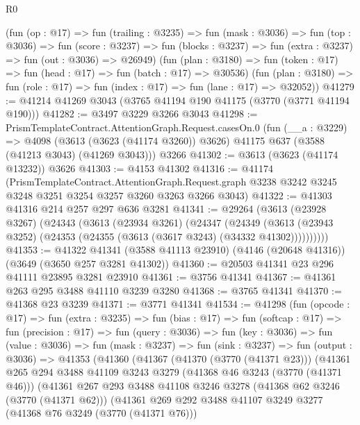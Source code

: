 \begin{lexlean}{R0}
\begin{coremodule}
      (fun (op : @17) =>
      fun (trailing : @3235) =>
      fun (mask : @3036) =>
      fun (top : @3036) =>
      fun (score : @3237) =>
      fun (blocks : @3237) => fun (extra : @3237) => fun (out : @3036) => @26949)
      (fun (plan : @3180) => fun (token : @17) => fun (head : @17) => fun (batch : @17) => @30536)
      (fun (plan : @3180) => fun (role : @17) => fun (index : @17) => fun (lane : @17) => @32052))
@41279 := @41214 @41269 @3043 (@3765 @41194 @190 @41175 (@3770 (@3771 @41194 @190)))
@41282 := @3497 @3229 @3266 @3043
@41298 := PrismTemplateContract.AttentionGraph.Request.casesOn.{0}
    (fun (__a : @3229) =>
    @4098 (@3613 (@3623 (@41174 @3260)) @3626) @41175 @637 (@3588 (@41213 @3043) (@41269 @3043)))
    @3266
@41302 := @3613 (@3623 (@41174 @13232)) @3626
@41303 := @4153 @41302
@41316 := @41174
    (PrismTemplateContract.AttentionGraph.Request.graph
      @3238
      @3242
      @3245
      @3248
      @3251
      @3254
      @3257
      @3260
      @3263
      @3266
      @3043)
@41322 := @41303 @41316 @214 @257 @297 @636 @3281
@41341 := @29264
    (@3613
      (@23928 @3267)
      (@24343
        (@3613
          (@23934 @3261)
          (@24347
            (@24349
              (@3613 (@23943 @3252) (@24353 (@24355 (@3613 (@3617 @3243) (@34332 @41302))))))))))
@41353 := @41322
    @41341
    (@3588 @41113 @23910)
    (@4146 (@20648 @41316))
    (@3649 (@3650 @257 @3281 @41302))
@41360 := @20503 @41341 @23 @296 @41111 @23895 @3281 @23910
@41361 := @3756 @41341
@41367 := @41361 @263 @295 @3488 @41110 @3239 @3280
@41368 := @3765 @41341
@41370 := @41368 @23 @3239
@41371 := @3771 @41341
@41534 := @41298
    (fun (opcode : @17) =>
    fun (extra : @3235) =>
    fun (bias : @17) =>
    fun (softcap : @17) =>
    fun (precision : @17) =>
    fun (query : @3036) =>
    fun (key : @3036) =>
    fun (value : @3036) =>
    fun (mask : @3237) =>
    fun (sink : @3237) =>
    fun (output : @3036) =>
    @41353
      (@41360
        (@41367
          (@41370 (@3770 (@41371 @23)))
          (@41361
            @265
            @294
            @3488
            @41109
            @3243
            @3279
            (@41368 @46 @3243 (@3770 (@41371 @46)))
            (@41361
              @267
              @293
              @3488
              @41108
              @3246
              @3278
              (@41368 @62 @3246 (@3770 (@41371 @62)))
              (@41361
                @269
                @292
                @3488
                @41107
                @3249
                @3277
                (@41368 @76 @3249 (@3770 (@41371 @76)))

\end{coremodule}
\end{lexlean}
